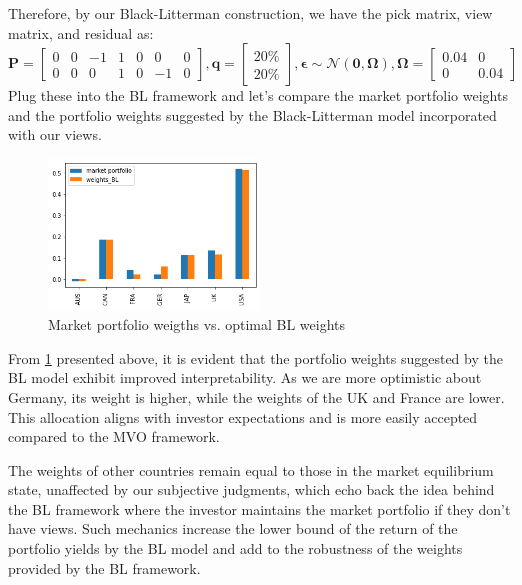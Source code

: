 \documentclass[13pt]{article}
\theoremstyle{definition}
\theoremstyle{remark}
\begin{document}
Therefore, by our Black-Litterman construction, we have the pick matrix, view matrix, and residual as:
$$
\mathbf{P} = \begin{bmatrix}
0 & 0 & -1 & 1 & 0 & 0 & 0 \\
0 & 0 & 0 & 1 & 0 & -1 & 0 
\end{bmatrix}, 
\boldsymbol{q}=\begin{bmatrix}
20\%\\
20\%
\end{bmatrix}, \boldsymbol{\epsilon} \sim \mathcal{N}(\boldsymbol{0},\mathbf{\Omega}), \mathbf{\Omega} = \begin{bmatrix}
0.04 & 0\\
0 & 0.04
\end{bmatrix}
$$
Plug these into the BL framework and let's compare the market portfolio weights and the portfolio weights suggested by the Black-Litterman model incorporated with our views.

\begin{figure}[!htp]
    \centering
    \includegraphics[width=0.5\textwidth]{BL better.png}
    \caption{Market portfolio weigths vs. optimal BL weights}
    \label{fig:BL better}
\end{figure}
From \cref{fig:BL better} presented above, it is evident that the portfolio weights suggested by the BL model exhibit improved interpretability. As we are more optimistic about Germany, its weight is higher, while the weights of the UK and France are lower. This allocation aligns with investor expectations and is more easily accepted compared to the MVO framework.

The weights of other countries remain equal to those in the market equilibrium state, unaffected by our subjective judgments, which echo back the idea behind the BL framework where the investor maintains the market portfolio if they don't have views. Such mechanics increase the lower bound of the return of the portfolio yields by the BL model and add to the robustness of the weights provided by the BL framework.
\end{document}
